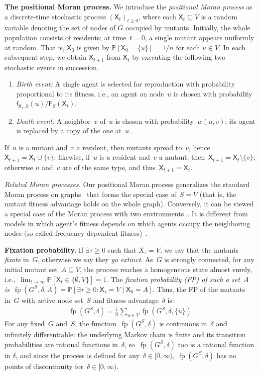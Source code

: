 \documentclass[letterpaper]{article}
\def\Pr{\mathbb{P}}
\newcommand{\TotalFitness}{\mathsf{F}}
\newcommand{\Fitness}{\mathsf{f}}
\newcommand{\X}{\mathsf{X}}
\newcommand{\fp}{\operatorname{fp}}
\newcommand{\Paragraph}[1]{{\smallskip\noindent\bf #1}}
\newcommand{\SubParagraph}[1]{{\smallskip\noindent\em #1}}
\newcommand{\FitAdv}{\delta}
\newcommand{\Weight}{w}
\begin{document}
\Paragraph{The positional Moran process.} We introduce the \emph{positional Moran process} as a discrete-time stochastic process $(\X_t)_{t\geq 0}$, where each $\X_t\subseteq V$ is a random variable denoting the set of nodes of $G$ occupied by mutants. Initially, the whole population consists of residents; at time~$t=0$, a single mutant appears uniformly at random. That is, $\X_0$ is given by $\Pr[\X_0=\{u\}]=1/n$ for each $u\in V$. In each subsequent step, we obtain $\X_{t+1}$ from $\X_{t}$ by executing the following two stochastic events in succession.
\begin{enumerate}
\item \emph{Birth event:} A single agent is selected for reproduction with probability proportional to its fitness, i.e., an agent on node~$u$ is chosen with probability $\Fitness_{\X_t, S}(u)/\TotalFitness_{S}(\X_{t})$.
\item \emph{Death event:} A neighbor~$v$ of~$u$ is chosen with probability~$\Weight(u,v)$; its agent is replaced by a copy of the one at~$u$.
\end{enumerate}
If~$u$ is a mutant and~$v$ a resident, then mutants spread to~$v$, hence~$\X_{t+1} = \X_t \cup \{v\}$; likewise, if~$u$ is a resident and~$v$ a mutant, then~$\X_{t+1} = \X_t \setminus \{v\}$; otherwise $u$ and~$v$ are of the same type, and thus~$\X_{t+1}=\X_{t}$.

\SubParagraph{Related Moran processes.}
Our positional Moran process generalizes the standard Moran process on graphs~\cite{Nowak2006}
that forms the special case of~$S \!=\! V$ (that is, the mutant fitness advantage holds on the whole graph).
Conversely, it can be viewed a special case of the Moran process with two environments~\cite{Kaveh2019}.
It is different from models in which agent's fitness depends on which agents occupy the neighboring nodes
(so-called frequency dependent fitness)~\cite{Huang2010}.

\Paragraph{Fixation probability.}
If $\exists\tau \ge 0$ such that $X_{\tau}=V$, we say that the mutants \emph{fixate} in~$G$, otherwise we say they \emph{go extinct}.
As~$G$ is strongly connected, for any initial mutant set~$A\subseteq V$, the process reaches a homogeneous state almost surely, i.e.,~$\lim_{t\to\infty} \Pr[\X_{t}\in \{\emptyset, V\}] = 1$.
The \emph{fixation probability (FP) of such a set~$A$ is}~$\fp(G^S,\FitAdv, A) = \Pr[\exists\tau \ge 0\colon \X_{\tau} \!=\! V \mid \X_{0} \!=\! A]$.
Thus, the FP of the mutants in~$G$ with active node set~$S$ and fitness advantage~$\FitAdv$ is:
\begin{align}
\fp(G^S,\FitAdv)=\frac{1}{n}\sum_{u\in V}\fp(G^S,\FitAdv, \{u\})
\end{align}
For any fixed~$G$ and~$S$, the function~$\fp(G^S,\FitAdv)$ is continuous in~$\FitAdv$ and infinitely differentiable: the underlying Markov chain is finite and its transition probabilities are rational functions in~$\FitAdv$, so~$\fp(G^S,\FitAdv)$ too is a rational function in $\FitAdv$, and since the process is defined for any~$\FitAdv\in[0,\infty)$, $\fp(G^S, \FitAdv)$ has no points of discontinuity for~$\delta\in[0,\infty)$.
\end{document}
